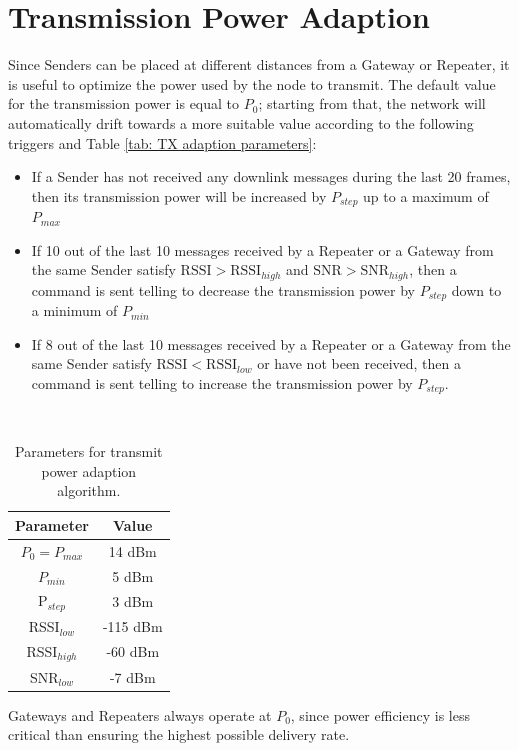 \section{Transmission Power Adaption}
\label{sec: transmission power adaption}
Since Senders can be placed at different distances from a Gateway or Repeater, it is useful to optimize the power
used by the node to transmit. The default value for the transmission power is equal to $P_{0}$; starting from that, the
network will automatically drift towards a more suitable value according to the following triggers and Table \ref{tab:
TX adaption parameters}:
\begin{itemize}
    \item If a Sender has not received any downlink messages during
        the last 20 frames, then its transmission power will be increased by $P_{step}$ up to a maximum of $P_{max}$
    \item If 10 out of the last 10 messages received by a Repeater or a Gateway from the same Sender
        satisfy $\text{RSSI} > \text{RSSI}_{high}$ and $\text{SNR} > \text{SNR}_{high}$, then
        a command is sent telling to decrease the transmission power by $P_{step}$ down to a minimum of
        $P_{min}$
    \item If 8 out of the last 10 messages received by a Repeater or a Gateway from the same Sender
        satisfy $\text{RSSI} < \text{RSSI}_{low}$ or have not been received, then a command is sent telling to
        increase the transmission power by $P_{step}$.
\end{itemize}
\\
\begin{table}[ht]
    \caption{Parameters for transmit power adaption algorithm.}
    \label{tab: TX adaption parameters}
    \centering
    \begin{tabular}{ |c|c| }
        \hline
        \textbf{Parameter} & \textbf{Value}\\
        \hline
        $P_{0} = P_{max}$ & 14 dBm\\
        \hline
        $P_{min}$ & 5 dBm\\
        \hline
        P$_{step}$ & 3 dBm\\
        \hline
        RSSI$_{low}$ & -115 dBm\\
        \hline
        RSSI$_{high}$ & -60 dBm\\
        \hline
        SNR$_{low}$ & -7 dBm\\
        \hline
    \end{tabular}
\end{table}
Gateways and Repeaters always operate at $P_{0}$, since power efficiency is less critical than ensuring the highest
possible delivery rate.


